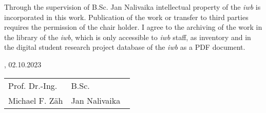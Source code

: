 Through the supervision of B.Sc. Jan Nalivaika intellectual property of the \textit{iwb} is incorporated in this work. Publication of the work or transfer to third parties requires the permission of the chair holder. I agree to the archiving of the work in the library of the \textit{iwb}, which is only accessible to \textit{iwb} staff, as inventory and in the digital student research project database of the \textit{iwb} as a PDF document.
\vfill

\IWBaddressCityChair, 02.10.2023
\vspace{2.5cm}\\
\begin{tabular}{p{0.5\linewidth}p{0.5\linewidth} }
	Prof. Dr.-Ing.		& B.Sc.\\
Michael F. Zäh  	& Jan Nalivaika
\end{tabular}


